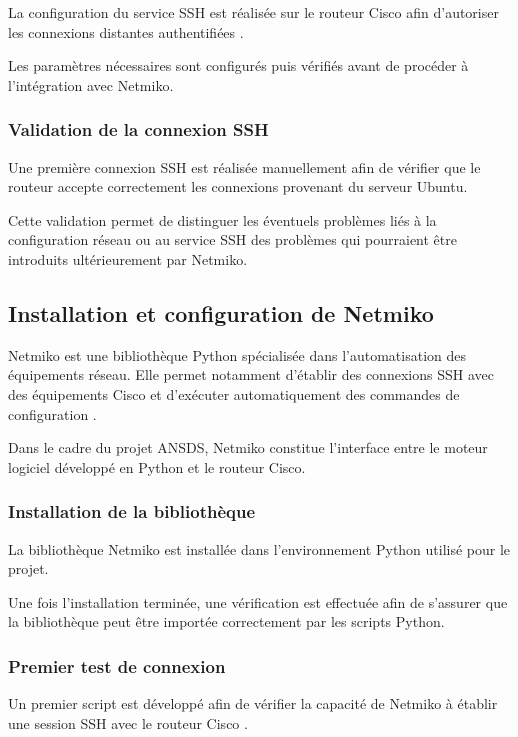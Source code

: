 La configuration du service SSH est réalisée sur le routeur Cisco afin d'autoriser les connexions distantes authentifiées \cite{rfc4253,cisco_ios}.

Les paramètres nécessaires sont configurés puis vérifiés avant de procéder à l'intégration avec Netmiko.

\subsubsection{Validation de la connexion SSH}

Une première connexion SSH est réalisée manuellement afin de vérifier que le routeur accepte correctement les connexions provenant du serveur Ubuntu.

Cette validation permet de distinguer les éventuels problèmes liés à la configuration réseau ou au service SSH des problèmes qui pourraient être introduits ultérieurement par Netmiko.

\subsection{Installation et configuration de Netmiko}

Netmiko est une bibliothèque Python spécialisée dans l'automatisation des équipements réseau. Elle permet notamment d'établir des connexions SSH avec des équipements Cisco et d'exécuter automatiquement des commandes de configuration \cite{netmiko_docs}.

Dans le cadre du projet ANSDS, Netmiko constitue l'interface entre le moteur logiciel développé en Python et le routeur Cisco.

\subsubsection{Installation de la bibliothèque}

La bibliothèque Netmiko est installée dans l'environnement Python utilisé pour le projet.

Une fois l'installation terminée, une vérification est effectuée afin de s'assurer que la bibliothèque peut être importée correctement par les scripts Python.

\subsubsection{Premier test de connexion}

Un premier script est développé afin de vérifier la capacité de Netmiko à établir une session SSH avec le routeur Cisco \cite{netmiko_docs}.

